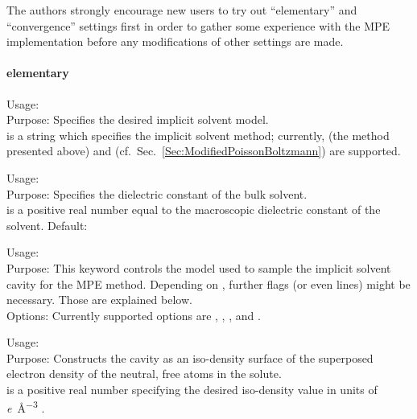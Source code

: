 The authors strongly encourage new users to try out ``elementary'' and ``convergence'' settings first in order to gather some experience with the MPE implementation before any modifications of other settings are made.

\paragraph{elementary}

{
  \noindent
  Usage:   \\[1.0ex] 
  Purpose: Specifies the desired implicit solvent model. \\[1.0ex]
   is a string which specifies the implicit solvent method; 
    currently,  (the method presented above) and 
     (cf.~Sec.~\ref{Sec:ModifiedPoissonBoltzmann}) 
    are supported. \\
}


{
  \noindent
  Usage:   \\[1.0ex] 
  Purpose: Specifies the dielectric constant of the bulk solvent. \\[1.0ex]
   is a positive real number equal to the macroscopic 
    dielectric constant of the solvent. Default:  \\
}


{
  \noindent
  Usage:   \\[1.0ex] 
  Purpose: This keyword controls the model used to sample 
    the implicit solvent cavity for the MPE method. 
    Depending on , further flags (or even lines) might be 
    necessary. Those are explained below. \\[1.0ex]
  Options: Currently supported options are 
    , 
    , 
    , 
    and . \\
}

{
  \noindent
  Usage:  
     \\[1.0ex] 
  Purpose: Constructs the cavity as an iso-density surface of the 
    superposed electron density of the neutral, free atoms in
    the solute. \\[1.0ex]
   is a positive real number specifying the 
    desired iso-density value in units of 
    \si{\elementarycharge\per\cubic\angstrom} .
}

